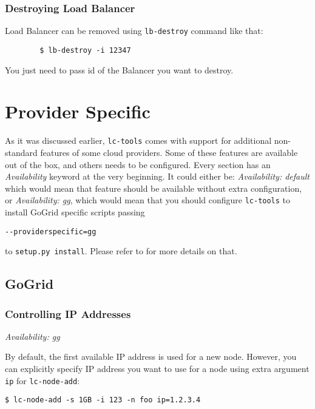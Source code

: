 \documentclass[a4paper]{report}
\begin{document}
                 \subsubsection{Destroying Load Balancer}
                 Load Balancer can be removed using \texttt{lb-destroy} command like that:

                 \begin{verbatim}
		$ lb-destroy -i 12347
                 \end{verbatim}

                 You just need to pass id of the Balancer you want to destroy.

\section{Provider Specific} \label{provspec}

As it was discussed earlier, {\tt lc-tools} comes with support for additional
non-standard features of some cloud providers. Some of these features are available
out of the box, and others needs to be configured. Every section has an
\textit{Availability} keyword at the very beginning. It could either be:
\textit{Availability: default} which would mean that feature should be available
without extra configuration, or \textit{Availability: gg}, which would mean
that you should configure {\tt lc-tools} to install GoGrid specific scripts passing

\begin{verbatim}
--providerspecific=gg
\end{verbatim}

to \texttt{setup.py install}. Please refer to  for more details on that.

\subsection{GoGrid}
\subsubsection{Controlling IP Addresses}

\textit{Availability: gg}

By default, the first available IP address is used for a new node. However, you
can explicitly specify IP address you want to use for a node using extra
argument {\tt ip} for \texttt{lc-node-add}:

\begin{verbatim}
$ lc-node-add -s 1GB -i 123 -n foo ip=1.2.3.4
\end{verbatim}
\end{document}
